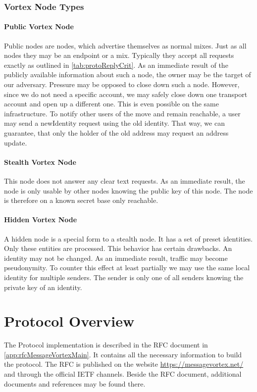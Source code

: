 \subsection{Vortex Node Types}

\subsubsection{Public Vortex Node}
Public nodes are nodes, which advertise themselves as normal mixes. Just as all nodes they may be an endpoint or a mix. Typically they accept all requests exactly as outlined in \ref{tab:protoReplyCrit}. As an immediate result of the publicly available information about such a node, the owner may be the target of our adversary. Pressure may be opposed to close down such a node. However, since we do not need a specific account, we may safely close down one transport account and open up a different one. This is even possible on the same infrastructure. To notify other users of the move and remain reachable, a user may send a newIdentity request using the old identity. That way, we can guarantee, that only the holder of the old address may request an address update.

\subsubsection{Stealth Vortex Node\label{sec:stealthNode}}
This node does not answer any clear text requests. As an immediate result, the node is only usable by other nodes knowing the public key of this node. The node is therefore on a known secret base only reachable.

\subsubsection{Hidden Vortex Node\label{sec:hiddenNode}}
A hidden node is a special form to a stealth node. It has a set of preset identities. Only these entities are processed. This behavior has certain drawbacks. An identity may not be changed. As an immediate result, traffic may become pseudonymity. To counter this effect at least partially we may use the same local identity for multiple senders. The sender is only one of all senders knowing the private key of an identity.

\chapter{Protocol Overview}
The Protocol implementation is described in the RFC document in \ref{app:rfcMessageVortexMain}. It contains all the necessary information to build the protocol. The RFC is published on the website \url{https://messagevortex.net/} and through the official IETF channels. Beside the RFC document, additional documents and references may be found there.

